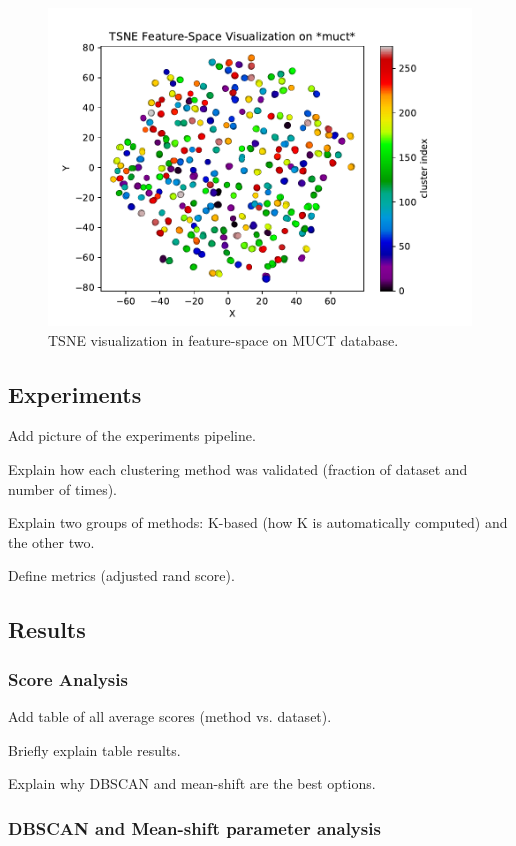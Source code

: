 \documentclass[conference]{IEEEtran}
\begin{document}
\begin{figure}[h]
\label{tsne_view_muct}
\includegraphics[width=\linewidth]{tsne_view_muct}
\caption{TSNE visualization in feature-space on MUCT database.}
\end{figure}

\subsection{Experiments}

Add picture of the experiments pipeline.

Explain how each clustering method was validated (fraction of dataset and number of times).

Explain two groups of methods: K-based (how K is automatically computed) and the other two.

Define metrics (adjusted rand score).

\subsection{Results}

\subsubsection{Score Analysis}

Add table of all average scores (method vs. dataset).

Briefly explain table results.

Explain why DBSCAN and mean-shift are the best options.

\subsubsection{DBSCAN and Mean-shift parameter analysis}
\end{document}
